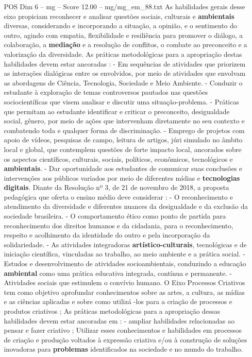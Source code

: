 \begin{textsample}{POS Dim 6 – mg – Score 12.00 – mg/mg\_em\_88.txt}
As habilidades gerais desse eixo propiciam reconhecer e analisar questões sociais, culturais e \textbf{ambientais} diversas, considerando e incorporando a situação, a opinião, e o sentimento do outro, agindo com empatia, flexibilidade e resiliência para promover o diálogo, a colaboração, a \textbf{mediação} e a resolução de conflitos, o combate ao preconceito e a valorização da diversidade.
As práticas metodológicas para a apropriação destas habilidades devem estar ancoradas : - Em sequências de atividades que priorizem as interações dialógicas entre os envolvidos, por meio de atividades que envolvam as abordagens de Ciência, Tecnologia, Sociedade e Meio Ambiente. - Conduzir o estudante à exploração de temas controversos pautados nas questões sociocientíficas que visem analisar e discutir uma situação-problema. - Práticas que permitam ao estudante identificar e criticar o preconceito, desigualdade social, gênero, por meio de ações que intervenham diretamente no seu contexto e combatendo toda e qualquer forma de discriminação. - Emprego de projetos com apoio de vídeos, pesquisas de campo, leitura de artigos, júri simulado no âmbito local e global, que contemplem questões de forte impacto local, ancorados sobre os aspectos científicos, culturais, sociais, políticos, econômicos, tecnológicos e \textbf{ambientais}. - Dar oportunidade aos estudantes de comunicar suas conclusões e intervenções aos públicos variados por meio de diferentes mídias e \textbf{tecnologias} \textbf{digitais}.
Diante da Resolução nº 3, de 21 de novembro de 2018, a proposta pedagógica que oferta o ensino médio deve considerar : - O reconhecimento e atendimento da diversidade e diferentes nuances da desigualdade e da exclusão da sociedade brasileira. - O comportamento ético como ponto de partida para reconhecimento dos direitos humanos e da cidadania, para o reconhecimento, respeito e acolhimento da identidade do outro e pela incorporação da solidariedade. - As atividades integradoras \textbf{artístico-culturais}, tecnológicas e de iniciação científica, vinculadas ao trabalho, ao meio ambiente e a prática social. - Estudos e desenvolvimento de atividades socioambientais, conduzindo a educação \textbf{ambiental} como uma prática educativa integrada, contínua e permanente. - Atividades sociais que estimulem o convívio humano.
O Eixo Processos Criativos tem como objetivo aprofundar conhecimentos sobre as artes, a cultura, as mídias e as ciências aplicadas e sobre como utilizá -los para a criação de processos e produtos criativos ; As práticas metodológicas para a apropriação dessas habilidades devem estar ancoradas em : - ampliar habilidades relacionadas ao pensar e fazer criativo ; Utilizar esses conhecimentos e habilidades em processos de criação e produção voltados à expressão criativa e/ou à construção de soluções inovadoras para \textbf{problemas} identificados na sociedade e no mundo do trabalho.

\end{textsample}
